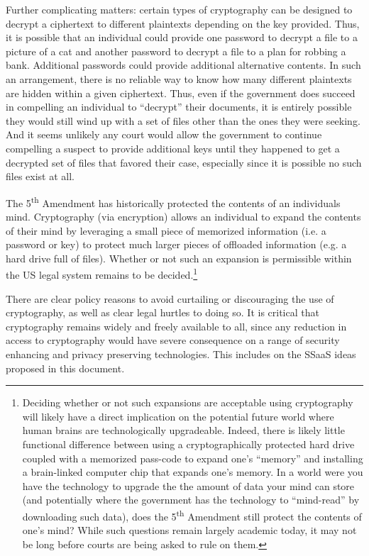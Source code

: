 Further complicating matters: certain types of cryptography can be
designed to decrypt a ciphertext to different plaintexts depending on
the key provided. Thus, it is possible that an individual could
provide one password to decrypt a file to a picture of a cat and
another password to decrypt a file to a plan for robbing a
bank. Additional passwords could provide additional alternative
contents. In such an arrangement, there is no reliable way to know how
many different plaintexts are hidden within a given ciphertext. Thus,
even if the government does succeed in compelling an individual to
``decrypt'' their documents, it is entirely possible they would still
wind up with a set of files other than the ones they were seeking. And
it seems unlikely any court would allow the government to continue
compelling a suspect to provide additional keys until they happened to
get a decrypted set of files that favored their case, especially since
it is possible no such files exist at all.

The 5\textsuperscript{th} Amendment has historically protected the
contents of an individuals mind. Cryptography (via encryption) allows
an individual to expand the contents of their mind by leveraging a
small piece of memorized information (i.e. a password or key) to
protect much larger pieces of offloaded information (e.g. a hard drive
full of files). Whether or not such an expansion is permissible within
the US legal system remains to be decided.\footnote{Deciding whether
  or not such expansions are acceptable using cryptography will likely
  have a direct implication on the potential future world where human
  brains are technologically upgradeable. Indeed, there is likely
  little functional difference between using a cryptographically
  protected hard drive coupled with a memorized pass-code to expand
  one's ``memory'' and installing a brain-linked computer chip that
  expands one's memory. In a world were you have the technology to
  upgrade the the amount of data your mind can store (and potentially
  where the government has the technology to ``mind-read'' by
  downloading such data), does the 5\textsuperscript{th} Amendment
  still protect the contents of one's mind? While such questions
  remain largely academic today, it may not be long before courts are
  being asked to rule on them.}

There are clear policy reasons to avoid curtailing or discouraging the
use of cryptography, as well as clear legal hurtles to doing so. It is
critical that cryptography remains widely and freely available to all,
since any reduction in access to cryptography would have severe
consequence on a range of security enhancing and privacy preserving
technologies. This includes on the SSaaS ideas proposed in this
document.

